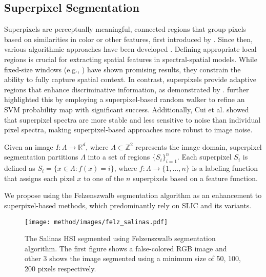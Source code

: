 \subsection{Superpixel Segmentation} \label{sec:segmentation}

Superpixels are perceptually meaningful, connected regions that group pixels based on similarities in color or other features, first introduced by \citet{renmalik2003}. Since then, various algorithmic approaches have been developed \citep{achanta2012, felzenszwalb2004}. Defining appropriate local regions is crucial for extracting spatial features in spectral-spatial models. While fixed-size windows (e.g., \citet{ertem2020}) have shown promising results, they constrain the ability to fully capture spatial context. In contrast, superpixels provide adaptive regions that enhance discriminative information, as demonstrated by \citet{fang2015kernals}. \citet{cui2018} further highlighted this by employing a superpixel-based random walker to refine an SVM probability map with significant success. Additionally, Cui et al. showed that superpixel spectra are more stable and less sensitive to noise than individual pixel spectra, making superpixel-based approaches more robust to image noise.



\begin{definition}  
Given an image \( I : \Lambda \to \mathbb{R}^d \), where \( \Lambda \subset \mathbb{Z}^2 \) represents the image domain, superpixel segmentation partitions \( \Lambda \) into a set of regions \(\{S_i\}_{i=1}^n\). Each superpixel \( S_i \) is defined as \( S_i = \{x \in \Lambda : f(x) = i\} \), where \( f: \Lambda \to \{1, \ldots, n\} \) is a labeling function that assigns each pixel \( x \) to one of the \( n \) superpixels based on a feature function.  
\end{definition}


We propose using the Felzenszwalb segmentation algorithm \citep{felzenszwalb2004} as an enhancement to superpixel-based methods, which predominantly rely on SLIC \citep{achanta2010slic} and its variants.

\begin{figure}[h]
    \centering
    \texttt{[image: method/images/felz\_salinas.pdf]}
    \caption{The Salinas HSI segmented using Felzenszwalb segmentation algorithm. \citep{felzenszwalb2004} The first figure shows a false-colored RGB image and other 3 shows the image segmented using a minimum size of 50, 100, 200 pixels respectively.}
    \label{fig:felz_salinas}
\end{figure}

